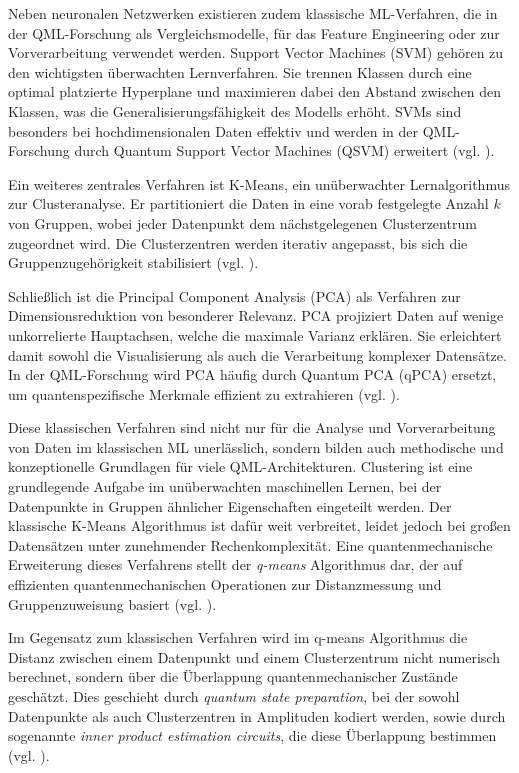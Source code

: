 Neben neuronalen Netzwerken existieren zudem klassische ML-Verfahren, die in der QML-Forschung als Vergleichsmodelle, für das Feature Engineering oder zur Vorverarbeitung verwendet werden. Support Vector Machines (SVM) gehören zu den wichtigsten überwachten Lernverfahren. Sie trennen Klassen durch eine optimal platzierte Hyperplane und maximieren dabei den Abstand zwischen den Klassen, was die Generalisierungsfähigkeit des Modells erhöht. SVMs sind besonders bei hochdimensionalen Daten effektiv und werden in der QML-Forschung durch Quantum Support Vector Machines (QSVM) erweitert (vgl. \cite{janiesch_machine_2021}).

Ein weiteres zentrales Verfahren ist K-Means, ein unüberwachter Lernalgorithmus zur Clusteranalyse. Er partitioniert die Daten in eine vorab festgelegte Anzahl $k$ von Gruppen, wobei jeder Datenpunkt dem nächstgelegenen Clusterzentrum zugeordnet wird. Die Clusterzentren werden iterativ angepasst, bis sich die Gruppenzugehörigkeit stabilisiert (vgl. \cite{janiesch_machine_2021}).

Schließlich ist die Principal Component Analysis (PCA) als Verfahren zur Dimensionsreduktion von besonderer Relevanz. PCA projiziert Daten auf wenige unkorrelierte Hauptachsen, welche die maximale Varianz erklären. Sie erleichtert damit sowohl die Visualisierung als auch die Verarbeitung komplexer Datensätze. In der QML-Forschung wird PCA häufig durch Quantum PCA (qPCA) ersetzt, um quantenspezifische Merkmale effizient zu extrahieren (vgl. \cite{janiesch_machine_2021}).

Diese klassischen Verfahren sind nicht nur für die Analyse und Vorverarbeitung von Daten im klassischen ML unerlässlich, sondern bilden auch methodische und konzeptionelle Grundlagen für viele QML-Architekturen. Clustering ist eine grundlegende Aufgabe im unüberwachten maschinellen Lernen, bei der Datenpunkte in Gruppen ähnlicher Eigenschaften eingeteilt werden. Der klassische K-Means Algorithmus ist dafür weit verbreitet, leidet jedoch bei großen Datensätzen unter zunehmender Rechenkomplexität. Eine quantenmechanische Erweiterung dieses Verfahrens stellt der \textit{q-means} Algorithmus dar, der auf effizienten quantenmechanischen Operationen zur Distanzmessung und Gruppenzuweisung basiert (vgl. \cite{kerenidis_q-means_2019}).

Im Gegensatz zum klassischen Verfahren wird im q-means Algorithmus die Distanz zwischen einem Datenpunkt und einem Clusterzentrum nicht numerisch berechnet, sondern über die Überlappung quantenmechanischer Zustände geschätzt. Dies geschieht durch \textit{quantum state preparation}, bei der sowohl Datenpunkte als auch Clusterzentren in Amplituden kodiert werden, sowie durch sogenannte \textit{inner product estimation circuits}, die diese Überlappung bestimmen (vgl. \cite{kerenidis_q-means_2019}).

